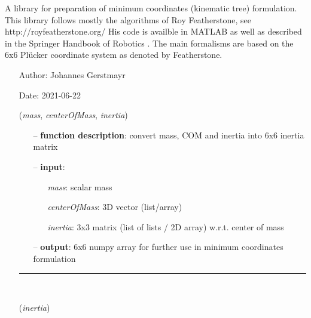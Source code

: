 \begin{itemize}[leftmargin=1.4cm]
\begin{itemize}[leftmargin=0.5cm]
\begin{itemize}[leftmargin=1.4cm]
\begin{itemize}[leftmargin=1.4cm]
\begin{itemize}[leftmargin=0.5cm]
\begin{itemize}[leftmargin=1.4cm]
\begin{itemize}[leftmargin=0.5cm]
\begin{itemize}[leftmargin=1.4cm]
\begin{itemize}[leftmargin=1.4cm]
%
\label{sec:module:kinematicTree}
  A library for preparation of minimum coordinates (kinematic tree) formulation.
			This library follows mostly the algorithms of Roy Featherstone, see http://royfeatherstone.org/
           His code is availble in MATLAB as well as described in the Springer Handbook of Robotics \cite{Siciliano2016}.
			The main formalisms are based on the 6x6 Pl\"ucker coordinate system as denoted by Featherstone.
\begin{itemize}[leftmargin=1.4cm]
\setlength{\itemindent}{-1.4cm}
\item[]Author:    Johannes Gerstmayr
\item[]Date:      2021-06-22
\ei
\begin{flushleft}
\label{sec:kinematicTree:MassCOMinertia2T66}
({\it mass}, {\it centerOfMass}, {\it inertia})
\end{flushleft}
\setlength{\itemindent}{0.7cm}
\begin{itemize}[leftmargin=0.7cm]
  \item[--]  {\bf function description}: convert mass, COM and inertia into 6x6 inertia matrix  \item[--]  {\bf input}: \vspace{-6pt}
  \begin{itemize}[leftmargin=1.2cm]
\setlength{\itemindent}{-0.7cm}
    \item[] {\it mass}: scalar mass
    \item[] {\it   centerOfMass}: 3D vector (list/array)
    \item[] {\it   inertia}: 3x3 matrix (list of lists / 2D array) w.r.t. center of mass
  \end{itemize}
  \item[--]  {\bf output}: 6x6 numpy array for further use in minimum coordinates formulation\vspace{12pt}\end{itemize}
%
\noindent\rule{8cm}{0.75pt}\vspace{1pt} \\ 
\begin{flushleft}
\label{sec:kinematicTree:Inertia2T66}
({\it inertia})
\end{flushleft}
\setlength{\itemindent}{0.7cm}

\end{itemize}
\end{itemize}
\end{itemize}
\end{itemize}
\end{itemize}
\end{itemize}
\end{itemize}
\end{itemize}
\end{itemize}
\end{itemize}
